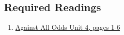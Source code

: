 \documentclass[letterpaper,9pt,twocolumn,twoside,printwatermark=false]{pinp}
\begin{document}
\subsection{Required Readings}\label{required-readings-1}

\begin{enumerate}
\item \href{https://www.learner.org/courses/againstallodds/pdfs/AgainstAllOdds_StudentGuide_Unit04.pdf#page=1}{Against All Odds Unit 4, pages 1-6}
\end{enumerate}





\end{document}
